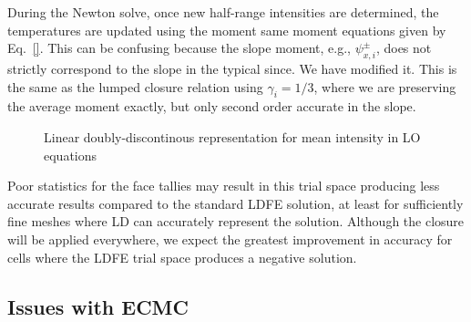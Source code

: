 During the Newton solve, once new half-range
intensities are determined, the temperatures are updated using the moment same moment
equations given by Eq.~\eqref{}. This can be confusing because the slope moment,
e.g., $\psi_{x,i}^\pm$, does not strictly correspond to the slope in the typical since.
We have modified it.  This is the same as the lumped closure relation using
$\gamma_i=1/3$, where we are preserving the average moment exactly, but only second order
accurate in the slope.


\begin{figure}[H]
    \centering
    {}
    \caption{Linear doubly-discontinous representation for mean intensity in LO equations}
    \label{fig:ldd_space}
\end{figure}

Poor statistics for the face tallies may result in this trial space producing less
accurate results compared to the standard LDFE solution, at least for sufficiently fine meshes where LD
can accurately represent the solution.  Although the closure will be applied everywhere,
we expect the greatest improvement in accuracy for cells where the LDFE trial space
produces a negative solution.

\subsection{Issues with ECMC}

